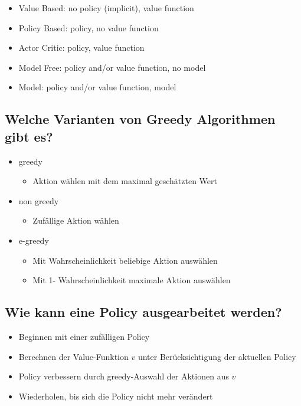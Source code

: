 \documentclass[a4paper]{article}
\begin{document}
		\begin{itemize}
			\item Value Based: no policy (implicit), value function
			\item Policy Based: policy, no value function
			\item Actor Critic: policy, value function
			\item Model Free: policy and/or value function, no model
			\item Model: policy and/or value function, model
		\end{itemize}
	
		\subsection{Welche Varianten von Greedy Algorithmen gibt es?}
		
		\begin{itemize}
			\item greedy
				\begin{itemize}
					\item Aktion wählen mit dem maximal geschätzten Wert
				\end{itemize}
			\item non greedy
				\begin{itemize}
					\item Zufällige Aktion wählen
				\end{itemize}
			\item e-greedy
				\begin{itemize}
					\item Mit Wahrscheinlichkeit beliebige Aktion auswählen
					\item Mit 1- Wahrscheinlichkeit maximale Aktion auswählen
				\end{itemize}
		\end{itemize}
	
		\subsection{Wie kann eine Policy ausgearbeitet werden?}
		
		\begin{itemize}
			\item Beginnen mit einer zufälligen Policy
			\item Berechnen der Value-Funktion $v$ unter Berücksichtigung der aktuellen Policy
			\item Policy verbessern durch greedy-Auswahl der Aktionen aus $v$
			\item Wiederholen, bis sich die Policy nicht mehr verändert
		\end{itemize}
		
		
		
	
\end{document}
